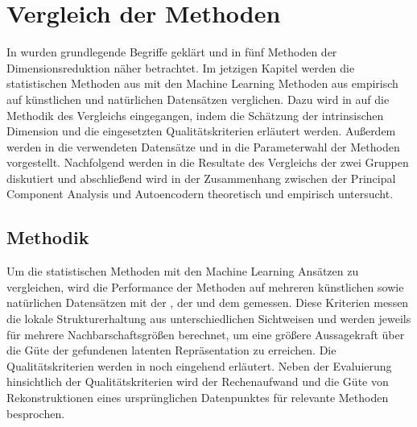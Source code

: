 \chapter{Vergleich der Methoden}
\label{ch:Vergleich}

In  wurden grundlegende Begriffe geklärt und in
 fünf Methoden der Dimensionsreduktion näher betrachtet. Im jetzigen
Kapitel werden die statistischen Methoden aus  mit den
Machine Learning Methoden aus  empirisch auf künstlichen und
natürlichen Datensätzen verglichen. Dazu wird in  auf die
Methodik des Vergleichs eingegangen, indem die Schätzung der intrinsischen Dimension und die
eingesetzten Qualitätskriterien erläutert werden. Außerdem werden in
 die verwendeten Datensätze und in
 die Parameterwahl der Methoden vorgestellt.
Nachfolgend werden in  die Resultate des Vergleichs der zwei
Gruppen diskutiert und abschließend wird in  der
Zusammenhang zwischen der Principal Component Analysis und Autoencodern theoretisch und empirisch
untersucht.

\section{Methodik}
\label{ch:Vergleich:sec:Methodik}

Um die statistischen Methoden mit den Machine Learning Ansätzen zu vergleichen, wird die
Performance der Methoden auf mehreren künstlichen sowie natürlichen Datensätzen mit der
, der  und dem  gemessen. Diese Kriterien messen die lokale Strukturerhaltung aus unterschiedlichen
Sichtweisen und werden jeweils für mehrere Nachbarschaftsgrößen berechnet, um eine größere
Aussagekraft über die Güte der gefundenen latenten Repräsentation zu erreichen. Die
Qualitätskriterien werden in  noch
eingehend erläutert. Neben der Evaluierung hinsichtlich der Qualitätskriterien wird der
Rechenaufwand und die Güte von Rekonstruktionen eines ursprünglichen Datenpunktes für relevante
Methoden besprochen.

